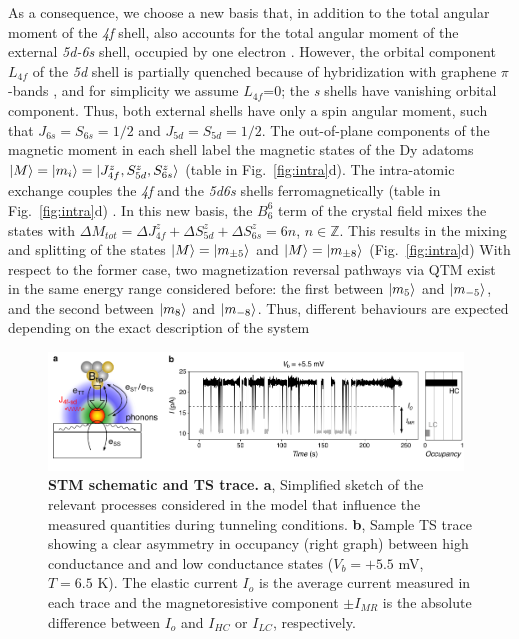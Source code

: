 \documentclass[
reprint,amsmath,amssymb,aps]{revtex4-2}
\begin{document}
As a consequence, we choose a new basis that, in addition to the total angular moment of the \textit{4f} shell, also accounts for the total angular moment of the external \textit{5d-6s} shell, occupied by one electron \cite{pivettaMeasuringIntraAtomicExchange2020,pivettaMeasuringIntraAtomicExchange2020}. However, the orbital component  $L_{4f}$ of the \textit{5d} shell is partially quenched because of hybridization with graphene $\pi$-bands \cite{donati2014}, and for simplicity we assume $L_{4f}$=0; the \textit{s} shells have vanishing orbital component. Thus, both external shells have only a spin angular moment, such that $J_{6s}=S_{6s}=1/2$ and $J_{5d}=S_{5d}=1/2$. The out-of-plane components of the magnetic moment in each shell label the magnetic states of the Dy adatoms $\ket{M}=\ket{m_i}=\ket{J_{4f}^z,S_{5d}^z,S_{6s}^z}$ (table in Fig.~\ref{fig:intra}d).
The intra-atomic exchange couples the \textit{4f} and the \textit{5d6s} shells ferromagnetically (table in Fig.~\ref{fig:intra}d) \cite{pivettaMeasuringIntraAtomicExchange2020}. 
In this new basis, the $B_6^6$ term of the crystal field mixes the states with $\Delta M_{tot}=\Delta J_{4f}^z + \Delta S_{5d}^z + \Delta S_{6s}^z=6n$, $n\in \mathbb{Z}$. This results in the mixing and splitting of the states $\ket{M}=\ket{m_{\pm 5}}$ and $\ket{M}=\ket{m_{\pm 8}}$ (Fig.~\ref{fig:intra}d)
With respect to the former case, two magnetization reversal pathways via QTM exist in the same energy range considered before: the first between $\ket{m_{5}}$ and $\ket{m_{-5}}$, and the second between $\ket{m_{8}}$ and $\ket{m_{-8}}$. Thus, different behaviours are expected depending on the exact description of the system

\begin{figure}[ht!]
\includegraphics[width=0.98\textwidth]{Fig2_new.pdf}
\caption{\textbf{STM schematic and TS trace.} \textbf{a}, Simplified sketch of the relevant processes considered in the model that influence the measured quantities during tunneling conditions. \textbf{b}, Sample TS trace showing a clear asymmetry in occupancy (right graph) between high conductance and and low conductance states ($V_{b} = +5.5$ mV, $T = 6.5$ K). The elastic current $I_{o}$ is the average current measured in each trace and the magnetoresistive component $\pm I_{MR}$ is the absolute difference between $I_{o}$ and $I_{HC}$ or $I_{LC}$, respectively.
\label{fig:no_tip_tip_telegraph} }
\end{figure}
\end{document}
